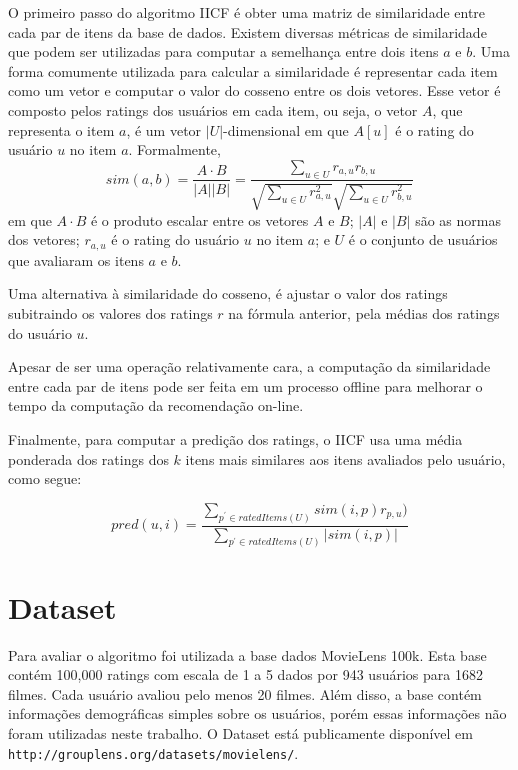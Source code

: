 \documentclass[12pt, a4paper, oneside]{article}
\begin{document}
O primeiro passo do algoritmo IICF é obter uma matriz de similaridade entre cada par de itens
da base de dados. Existem diversas métricas de similaridade que podem ser utilizadas para
computar a semelhança entre dois itens $a$ e $b$. Uma forma comumente utilizada para calcular
a similaridade é representar cada item como um vetor e computar o valor do cosseno entre os 
dois vetores. Esse vetor é composto pelos ratings dos usuários em cada item, ou seja,
o vetor $A$, que representa o item $a$, é um vetor $|U|$-dimensional em que $A[u]$ é o rating do usuário $u$ no item $a$. Formalmente,
$$sim(a,b) = \frac{A \cdot B}{|A| |B|} = \frac{ \sum\limits_{u \in U} r_{a,u} r_{b,u} }{ \sqrt{ \sum\limits_{u \in U} r_{a,u}^2 } \sqrt{ \sum\limits_{u \in U} r_{b,u}^2 } } $$
em que $A \cdot B$ é o produto escalar entre os vetores $A$ e $B$;  $|A|$ e $|B|$ são as normas dos vetores; $r_{a,u}$ é o rating do usuário $u$ no item $a$; e $U$ é o conjunto de usuários que avaliaram os itens $a$ e $b$.

Uma alternativa à similaridade do cosseno, é ajustar o valor dos ratings subitraindo os valores dos ratings $r$ na fórmula anterior, pela médias dos ratings do usuário $u$.


Apesar de ser uma operação relativamente cara, a computação da similaridade entre cada par de itens pode ser feita em um processo offline para melhorar o tempo da computação da recomendação on-line.

Finalmente, para computar a predição dos ratings, o IICF usa uma média ponderada dos ratings dos $k$ itens mais similares aos itens avaliados pelo usuário, como segue:

$$ pred(u, i) = \frac{ \sum_{p^\prime \in ratedItems(U)} sim(i,p) r_{p, u}) }{ \sum_{p^\prime \in ratedItems(U)} |sim(i,p)| } $$



\section{Dataset}
\label{sec:dataset}
Para avaliar o algoritmo foi utilizada a base dados MovieLens 100k. Esta base contém 100,000 ratings
com escala de 1 a 5 dados por 943 usuários para 1682 filmes. Cada usuário avaliou pelo menos 20 filmes.
Além disso, a base contém informações demográficas simples sobre os usuários, porém essas informações 
não foram utilizadas neste trabalho. O Dataset está publicamente disponível em \texttt{http://grouplens.org/datasets/movielens/}.
\end{document}
